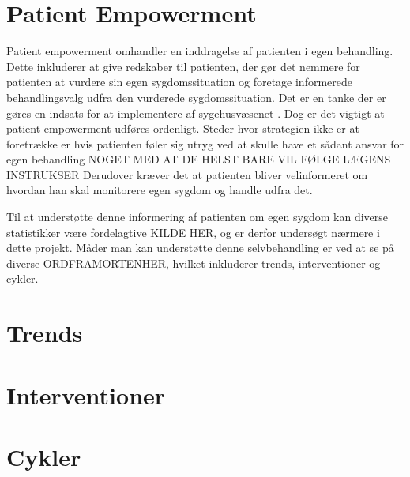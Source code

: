 \section{Patient Empowerment}
Patient empowerment omhandler en inddragelse af patienten i egen behandling.
Dette inkluderer at give redskaber til patienten, der gør det nemmere for patienten at vurdere sin egen sygdomssituation og foretage informerede behandlingsvalg udfra den vurderede sygdomssituation.
Det er en tanke der er gøres en indsats for at implementere af sygehusvæsenet \cite{misc:patientpowerhovedstaden}.
Dog er det vigtigt at patient empowerment udføres ordenligt.
Steder hvor strategien ikke er at foretrække er hvis patienten føler sig utryg ved at skulle have et sådant ansvar for egen behandling NOGET MED AT DE HELST BARE VIL FØLGE LÆGENS INSTRUKSER
Derudover kræver det at patienten bliver velinformeret om hvordan han skal monitorere egen sygdom og handle udfra det.

Til at understøtte denne informering af patienten om egen sygdom kan diverse statistikker være fordelagtive KILDE HER, og er derfor undersøgt nærmere i dette projekt.
Måder man kan understøtte denne selvbehandling er ved at se på diverse ORDFRAMORTENHER, hvilket inkluderer trends, interventioner og cykler.

\section{Trends}

\section{Interventioner}

\section{Cykler}